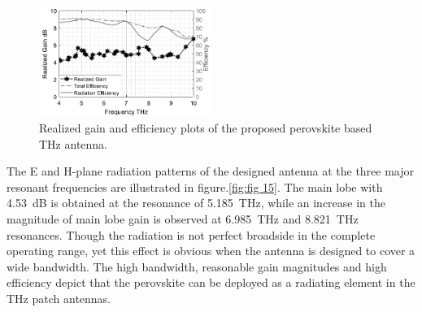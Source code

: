 \documentclass[12pt]{suhbook}
\begin{document}
\begin{figure}[hbt!]
\centering
\includegraphics[width=0.5\textwidth]{19}
\caption{Realized gain and efficiency plots of the proposed perovskite based THz antenna.}
\label{Fig 119}
\end{figure}
% 
The E and H-plane radiation patterns of the designed antenna at the three major resonant frequencies are illustrated in figure.\ref{fig:fig 15}. The main lobe with \SI{4.53 }{\deci\bel} is obtained at the resonance of \SI{5.185}{\THz}, while an increase in the magnitude of main lobe gain is observed at \SI{6.985}{\THz} and \SI{8.821}{\THz} resonances. Though the radiation is not perfect broadside in the complete operating range, yet this effect is obvious when the antenna is designed to cover a wide bandwidth. The high bandwidth, reasonable gain magnitudes and high efficiency depict that the perovskite can be deployed as a radiating element in the THz patch antennas.\\
\end{document}
